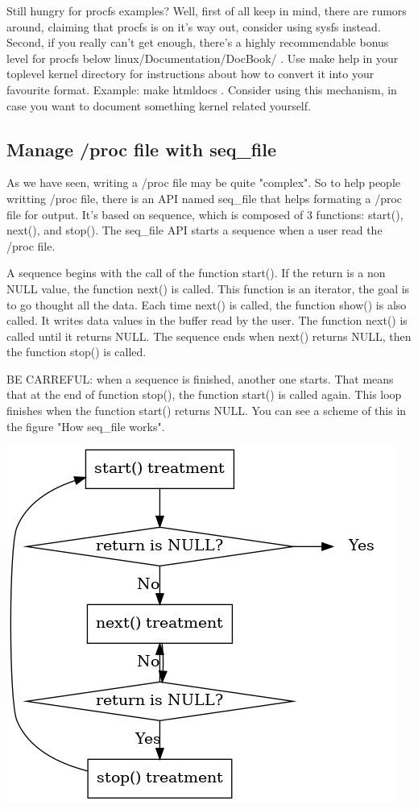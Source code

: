 \documentclass[11pt]{article}
\begin{document}
Still hungry for procfs examples? Well, first of all keep in mind, there are rumors around, claiming that procfs is on it's way out, consider using sysfs instead. Second, if you really can't get enough, there's a highly recommendable bonus level for procfs below linux/Documentation/DocBook/ . Use make help in your toplevel kernel directory for instructions about how to convert it into your favourite format. Example: make htmldocs . Consider using this mechanism, in case you want to document something kernel related yourself.

\subsection*{Manage /proc file with seq\_file}
\label{sec:orgf89c83b}
As we have seen, writing a /proc file may be quite "complex". So to help
people writting /proc file, there is an API named seq\_file that helps
formating a /proc file for output. It's based on sequence, which is composed of 3 functions: start(), next(), and stop(). The seq\_file API starts a sequence when a user read the /proc file.

A sequence begins with the call of the function start(). If the return is a
non NULL value, the function next() is called. This function is an iterator, the goal is to go thought all the data. Each time next() is called, the function show() is also called. It writes data values in the buffer read by the user. The function next() is called until it returns NULL. The sequence ends when next() returns NULL, then the function stop() is called.

BE CARREFUL: when a sequence is finished, another one starts. That means that at the end of function stop(), the function start() is called again. This loop finishes when the function start() returns NULL. You can see a scheme of this in the figure "How seq\_file works".

\begin{center}
\includegraphics[width=.9\linewidth]{img/seq_file.png}
\end{center}
\end{document}
